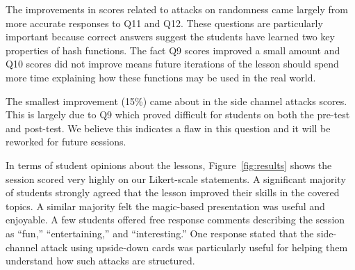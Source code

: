 The improvements in scores related to attacks on randomness
came largely
from more accurate responses to Q11 and Q12.
These questions are particularly important because
correct answers suggest the students have learned two
key properties of hash functions.
The fact Q9 scores improved a small amount and Q10 scores did not improve
means future iterations of the lesson should spend more time
explaining how these functions may be used in the real world.

The smallest improvement (15\%) came about in the side channel attacks
scores.  This is largely due to Q9 which proved difficult for students on
both the pre-test and post-test.  We believe this indicates a flaw in this
question and it will be reworked for future sessions.

In terms of student opinions about the lessons, Figure~\ref{fig:results}
shows the session scored very highly
on our Likert-scale statements.  A significant majority of students strongly
agreed that the lesson improved their skills in the covered topics.  A
similar majority felt the magic-based presentation was useful and
enjoyable.  A few students offered free response comments describing the
session as ``fun,'' ``entertaining,'' and ``interesting.''  One response
stated that the side-channel attack using upside-down cards
was particularly useful for helping them understand how such attacks are
structured.


%
%



